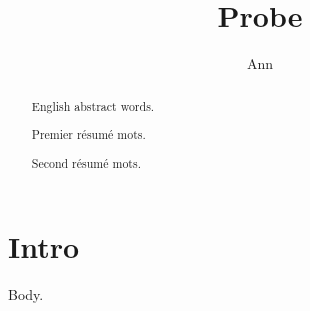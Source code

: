 \documentclass{article}
\begin{document}
\title{Probe}\author{Ann}
\maketitle
\begin{abstract}English abstract words.\end{abstract}
\section{Intro}
Body.

\begin{otherlanguage}{french}
\begin{abstract}Premier résumé mots.\end{abstract}
\begin{abstract}Second résumé mots.\end{abstract}
\end{otherlanguage}
\end{document}
